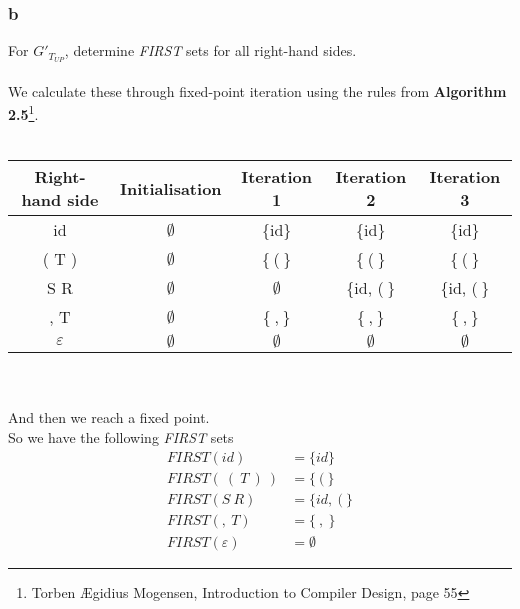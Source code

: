 \documentclass[12pt]{article}
\begin{document}
\subsubsection*{b}
For $G'_{T_{UP}}$, determine \textit{FIRST} sets for all right-hand sides.\\
\\
We calculate these through fixed-point iteration using the rules from \textbf{Algorithm 2.5}\footnote{Torben Ægidius Mogensen, Introduction to Compiler Design, page 55}.  \\
\\
\begin{tabular}{c|c|c|c|c}
\hline 
Right-hand side & Initialisation & Iteration 1 & Iteration 2 & Iteration 3 \\ 
\hline 
id & $\emptyset$ & \{id\} & \{id\} & \{id\} \\ 
( T ) & $\emptyset$ & \{$\:$($\:$\} & \{$\:$($\:$\} & \{$\:$($\:$\} \\ 
S R & $\emptyset$ & $\emptyset$ & \{id, ($\:$\} & \{id, ($\:$\} \\ 
, T & $\emptyset$ & \{$\:$,$\:$\} & \{$\:$,$\:$\} & \{$\:$,$\:$\} \\  
$\varepsilon$ & $\emptyset$ & $\emptyset$ & $\emptyset$ & $\emptyset$ \\ 
\hline
\end{tabular} \\
\\
And then we reach a fixed point.\\
So we have the following \textit{FIRST} sets
\begin{align*}
FIRST(id) &=\{id\} \\
FIRST(\:(\:T\:)\:) &= \{\:(\:\} \\
FIRST(S\:R) &= \{id,\:(\:\} \\
FIRST(,\:T) &= \{\:,\:\} \\
FIRST(\varepsilon) &= \emptyset
\end{align*}
\end{document}
